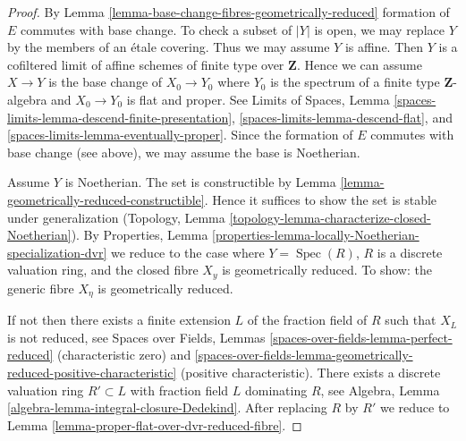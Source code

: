 \documentclass[10pt,a4paper]{amsart}
\theoremstyle{plain}
\theoremstyle{definition}
\theoremstyle{remark}
\numberwithin{equation}{subsection}
\def\Spec{\mathop{\mathrm{Spec}}}
\begin{document}
\begin{proof}
By Lemma \ref{lemma-base-change-fibres-geometrically-reduced}
formation of $E$ commutes with base change. To check a subset
of $|Y|$ is open, we may replace $Y$ by the members of an
\'etale covering. Thus we may assume $Y$ is affine.
Then $Y$ is a cofiltered limit of affine
schemes of finite type over $\mathbf{Z}$.
Hence we can assume $X \to Y$ is the
base change of $X_0 \to Y_0$ where $Y_0$ is the spectrum of a finite
type $\mathbf{Z}$-algebra and $X_0 \to Y_0$ is flat and proper.
See Limits of Spaces, Lemma
\ref{spaces-limits-lemma-descend-finite-presentation},
\ref{spaces-limits-lemma-descend-flat}, and
\ref{spaces-limits-lemma-eventually-proper}. Since the formation of
$E$ commutes with base change (see above),
we may assume the base is Noetherian.

\medskip\noindent
Assume $Y$ is Noetherian. The set is constructible by
Lemma \ref{lemma-geometrically-reduced-constructible}.
Hence it suffices to show the set is stable under generalization
(Topology, Lemma \ref{topology-lemma-characterize-closed-Noetherian}). By
Properties, Lemma \ref{properties-lemma-locally-Noetherian-specialization-dvr}
we reduce to the case where $Y = \Spec(R)$, $R$ is a discrete
valuation ring, and the closed fibre $X_y$ is geometrically
reduced. To show: the generic fibre $X_\eta$ is geometrically reduced.

\medskip\noindent
If not then there exists a finite extension $L$ of the fraction
field of $R$ such that $X_L$ is not reduced, see
Spaces over Fields, Lemmas
\ref{spaces-over-fields-lemma-perfect-reduced} (characteristic zero) and
\ref{spaces-over-fields-lemma-geometrically-reduced-positive-characteristic}
(positive characteristic). There exists a discrete valuation ring
$R' \subset L$ with fraction field $L$ dominating $R$, see
Algebra, Lemma \ref{algebra-lemma-integral-closure-Dedekind}.
After replacing $R$ by $R'$ we reduce to
Lemma \ref{lemma-proper-flat-over-dvr-reduced-fibre}.
\end{proof}
\end{document}
